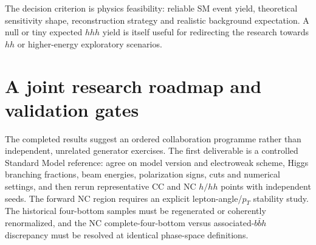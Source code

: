 \documentclass[12pt,a4paper]{article}
\newcommand{\newnote}{\clearpage}
\begin{document}
The decision criterion is physics feasibility: reliable SM event yield, theoretical sensitivity shape, reconstruction strategy and realistic background expectation. A null or tiny expected $hhh$ yield is itself useful for redirecting the research towards $hh$ or higher-energy exploratory scenarios.




\newnote

\section{A joint research roadmap and validation gates}
The completed results suggest an ordered collaboration programme rather than independent, unrelated generator exercises. The first deliverable is a controlled Standard Model reference: agree on model version and electroweak scheme, Higgs branching fractions, beam energies, polarization signs, cuts and numerical settings, and then rerun representative CC and NC $h/hh$ points with independent seeds. The forward NC region requires an explicit lepton-angle/$p_T$ stability study. The historical four-bottom samples must be regenerated or coherently renormalized, and the NC complete-four-bottom versus associated-$b\bar b h$ discrepancy must be resolved at identical phase-space definitions.
\end{document}
